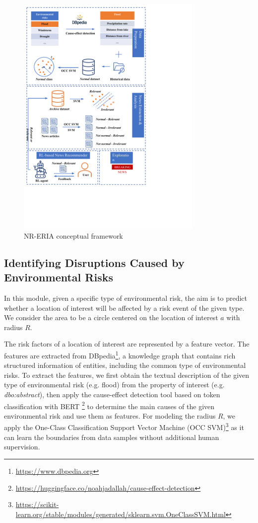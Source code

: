 \documentclass[
]{ceurart}
\begin{document}
\begin{figure}[h]
  \centering
  
  \includegraphics[page=2,trim=0cm 4.5cm 3cm 0.5cm, width=0.8\textwidth]{photo/overview.pdf}
  \caption{NR-ERIA conceptual framework}\label{RL-ERIA}
  \vspace{-0.2in}
\end{figure}

\subsection{Identifying Disruptions Caused by Environmental Risks} \label{sec:radius}

In this module, given a specific type of environmental risk, the aim is to predict whether a location of interest will be affected by a risk event of the given type. 
We consider the area to be a circle centered on the location of interest $a$ with radius $R$. 

The risk factors of a location of interest are represented by a feature vector. The features are extracted from DBpedia\footnote{\url{https://www.dbpedia.org}}, a knowledge graph that contains rich structured information of entities, including the common type of environmental risks. To extract the features, we first obtain the textual description of the given type of environmental risk (e.g. flood) from the property of interest (e.g. \textit{dbo:abstract}), then apply the cause-effect detection tool based on token classification with BERT \footnote{\url{https://huggingface.co/noahjadallah/cause-effect-detection}} to determine the main causes of the given environmental risk and use them as features. 
For modeling the radius $R$, we apply the One-Class Classification Support Vector Machine (OCC SVM)\footnote{\url{https://scikit-learn.org/stable/modules/generated/sklearn.svm.OneClassSVM.html}} \cite{DBLP:journals/neco/ScholkopfPSSW01} as it can learn the boundaries from data samples without additional human supervision. 
\end{document}

